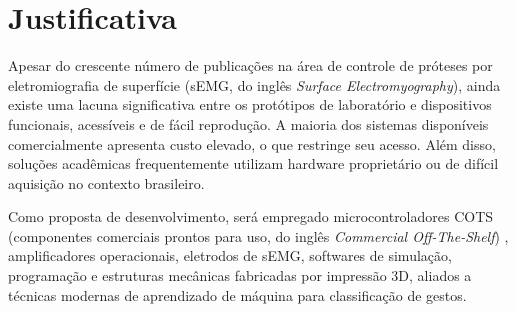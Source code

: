 \section{Justificativa}

Apesar do crescente número de publicações na área de controle de próteses por eletromiografia de superfície (sEMG, do inglês \textit{Surface Electromyography}), ainda existe uma lacuna significativa entre os protótipos de laboratório e dispositivos funcionais, acessíveis e de fácil reprodução. A maioria dos sistemas disponíveis comercialmente apresenta custo elevado, o que restringe seu acesso. Além disso, soluções acadêmicas frequentemente utilizam hardware proprietário ou de difícil aquisição no contexto brasileiro.

Como proposta de desenvolvimento, será empregado microcontroladores COTS (componentes comerciais prontos para uso, do inglês \textit{Commercial Off-The-Shelf}) , amplificadores operacionais, eletrodos de sEMG, softwares de simulação, programação e estruturas mecânicas fabricadas por impressão 3D, aliados a técnicas modernas de aprendizado de máquina para classificação de gestos.

